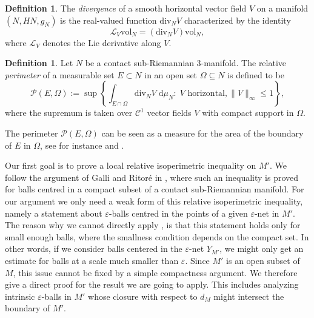 \documentclass[10pt,letterpaper]{amsart}
\theoremstyle{definition}
\newtheorem{definition}[thm]{Definition}
\numberwithin{thm}{subsection}
\numberwithin{equation}{section}
\begin{document}
\begin{definition}\label{eq:smoothDiv}
The \emph{divergence} of a smooth horizontal vector field $V$ on a manifold $(N,HN,g_N)$ is the real-valued function $\mathrm{div}_N V$ characterized by the identity
\begin{equation}\label{eq:Lie_deriv_div}
\mathcal{L}_V \mathrm{vol}_N = (\mathrm{div}_N V)\mathrm{vol}_N,
\end{equation}
where $\mathcal{L}_V$ denotes the Lie derivative along $V$.
\end{definition}

\begin{definition} Let $N$ be a contact sub-Riemannian $3$-manifold.  The relative
\emph{perimeter} of a measurable set $E\subset N$ in an open set $\Omega \subseteq N$ is defined to be
\begin{displaymath}
\mathcal{P}(E,\Omega) := \sup \left\{ \int_{E \cap \Omega} \mathrm{div}_N V\;\mathrm{d}\mu_N:\; V\text{ horizontal,}\, \|V\|_{\infty}\leq 1 \right\},
\end{displaymath}
where the supremum is taken over $\mathcal{C}^1$ vector fields $V$ with compact support in $\Omega$.
\end{definition}

The perimeter $\mathcal{P}(E,\Omega)$ can be seen as a measure for the area of the boundary of $E$ in $\Omega$, see for instance \cite[2.3]{MR3412382} and \cite[(2.7)]{MR3474402}.

Our first goal is to prove a local relative isoperimetric inequality on $M'$.
We follow the argument of Galli and Ritor\'{e} in \cite{MR2979606}, where such an inequality is proved for balls centred in a compact subset of a contact sub-Riemannian manifold. For our argument we only need a weak form of this relative isoperimetric inequality, namely a statement about $\varepsilon$-balls centred in the points of a given $\varepsilon$-net in $M'$. The reason why we cannot directly apply \cite[Lemma 3.7]{MR2979606}, is that this statement holds only for small enough balls, where the smallness condition depends on the compact set. In other words, if we consider balls centered in the $\varepsilon$-net $Y_{M'}$, we might only get an estimate for balls at a scale much smaller than $\varepsilon$. Since $M'$ is an open subset of $M$, this issue cannot be fixed by a simple compactness argument. We therefore give a direct proof for the result  we are going to apply. This includes analyzing intrinsic $\varepsilon$-balls in $M'$ whose closure with respect to $d_M$ might intersect the boundary of $M'$.
\end{document}
